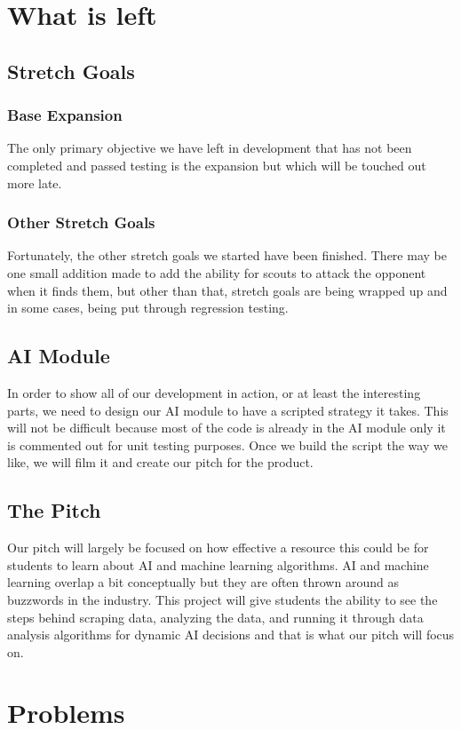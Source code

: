 \documentclass[10pt,letterpaper,onecolumn,draftclsnofoot]{IEEEtran}
\begin{document}
\section{What is left}
\subsection{Stretch Goals}

\subsubsection{Base Expansion}
The only primary objective we have left in development that has not been completed and passed testing is the expansion but which will be touched out more late. 
\subsubsection{Other Stretch Goals}
Fortunately, the other stretch goals we started have been finished. There may be one small addition made to add the ability for scouts to attack the opponent when it finds them, but other than that, stretch goals are being wrapped up and in some cases, being put through regression testing. 
\subsection{AI Module}
In order to show all of our development in action, or at least the interesting parts, we need to design our AI module to have a scripted strategy it takes. This will not be difficult because most of the code is already in the AI module only it is commented out for unit testing purposes. Once we build the script the way we like, we will film it and create our pitch for the product. 
\subsection{The Pitch}
Our pitch will largely be focused on how effective a resource this could be for students to learn about AI and machine learning algorithms. AI and machine learning overlap a bit conceptually but they are often thrown around as buzzwords in the industry. This project will give students the ability to see the steps behind scraping data, analyzing the data, and running it through data analysis algorithms for dynamic AI decisions and that is what our pitch will focus on.

\section{Problems}
\end{document}
